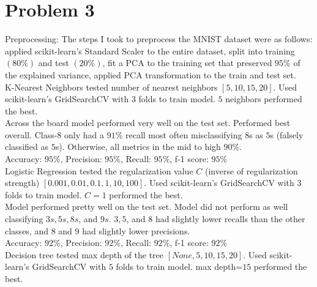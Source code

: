 \documentclass[10pt]{article}
\begin{document}
\section*{Problem 3}
Preprocessing: The steps I took to preprocess the MNIST dataset were as follows: applied scikit-learn's Standard Scaler to the entire dataset, split into training $(80\%)$ and test $(20\%)$, fit a PCA to the training set that preserved $95\%$ of the explained variance, applied PCA transformation to the train and test set.\\ 
K-Nearest Neighbors tested number of nearest neighbors $[5,10,15,20]$. Used scikit-learn's GridSearchCV with $3$ folds to train model. $5$ neighbors performed the best.\\
Across the board model performed very well on the test set. Performed best overall. Class-$8$ only had a $91\%$ recall most often misclassifying $8$s as $5$s (falsely classified as $5$s). Otherwise, all metrics in the mid to high $90\%$.\\
Accuracy: $95\%$, Precision: $95\%$, Recall: $95\%$, f-1 score: $95\%$\\
Logistic Regression tested the regularization value $C$ (inverse of regularization strength) $[0.001,0.01,0.1,1,10,100]$. Used scikit-learn's GridSearchCV with $3$ folds to train model. $C=1$ performed the best.\\
Model performed pretty well on the test set. Model did not perform as well classifying $3s,5s,8s$, and $9s$. $3,5$, and $8$ had slightly lower recalls than the other classes, and $8$ and $9$ had slightly lower precisions.\\
Accuracy: $92\%$, Precision: $92\%$, Recall: $92\%$, f-1 score: $92\%$\\
Decision tree tested max depth of the tree $[None, 5, 10, 15, 20]$. Used scikit-learn's GridSearchCV with $5$ folds to train model. max depth=$15$ performed the best.\\
\end{document}
